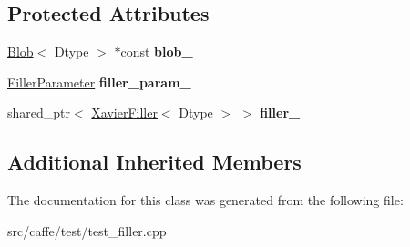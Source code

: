 \subsection*{Protected Attributes}
\begin{DoxyCompactItemize}
\item 
\mbox{\label{classcaffe_1_1_xavier_filler_test_a1e479a7d4ab91073a550cc814c02f5a8}} 
\mbox{\hyperlink{classcaffe_1_1_blob}{Blob}}$<$ Dtype $>$ $\ast$const {\bfseries blob\+\_\+}
\item 
\mbox{\label{classcaffe_1_1_xavier_filler_test_abdd8ee520cd7e29519946df92c7a1bae}} 
\mbox{\hyperlink{classcaffe_1_1_filler_parameter}{Filler\+Parameter}} {\bfseries filler\+\_\+param\+\_\+}
\item 
\mbox{\label{classcaffe_1_1_xavier_filler_test_a9afccfebd6c76e6551128140c6ca9fdb}} 
shared\+\_\+ptr$<$ \mbox{\hyperlink{classcaffe_1_1_xavier_filler}{Xavier\+Filler}}$<$ Dtype $>$ $>$ {\bfseries filler\+\_\+}
\end{DoxyCompactItemize}
\subsection*{Additional Inherited Members}


The documentation for this class was generated from the following file\+:\begin{DoxyCompactItemize}
\item 
src/caffe/test/test\+\_\+filler.\+cpp\end{DoxyCompactItemize}
